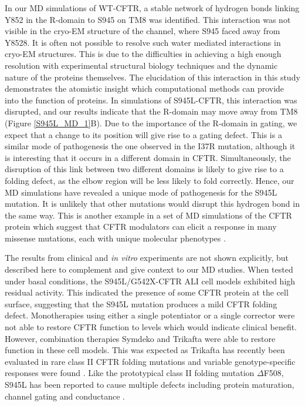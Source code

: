 In our MD simulations of WT-CFTR, a stable network of hydrogen bonds linking Y852 in the R-domain to S945 on TM8 was identified. This interaction was not visible in the cryo-EM structure of the channel, where S945 faced away from Y8528. It is often not possible to resolve such water mediated interactions in cryo-EM structures. This is due to the difficulties in achieving a high enough resolution with experimental structural biology techniques and the dynamic nature of the proteins themselves. The elucidation of this interaction in this study demonstrates the atomistic insight which computational methods can provide into the function of proteins. In simulations of S945L-CFTR, this interaction was disrupted, and our results indicate that the R-domain may move away from TM8 (Figure \ref{S945L_MD_1}B). Due to the importance of the R-domain in gating, we expect that a change to its position will give rise to a gating defect. This is a similar mode of pathogenesis the one observed in the I37R mutation, although it is interesting that it occurs in a different domain in CFTR. Simultaneously, the disruption of this link between two different domains is likely to give rise to a folding defect, as the elbow region will be less likely to fold correctly. Hence, our MD simulations have revealed a unique mode of pathogenesis for the S945L mutation. It is unlikely that other mutations would disrupt this hydrogen bond in the same way. This is another example in a set of MD simulations of the CFTR protein which suggest that CFTR modulators can elicit a response in many missense mutations, each with unique molecular phenotypes \cite{wong2022,wong2022a,billet2020,sabusap2021}. 

The results from clinical and \textit{in vitro} experiments are not shown explicitly, but described here to complement and give context to our MD studies. When tested under basal conditions, the S945L/G542X-CFTR ALI cell models exhibited high residual activity. This indicated the presence of some CFTR protein at the cell surface, suggesting that the S945L mutation produces a mild CFTR folding defect. Monotherapies using either a single potentiator or a single corrector were not able to restore CFTR function to levels which would indicate clinical benefit. However, combination therapies Symdeko and Trikafta were able to restore function in these cell models. This was expected as Trikafta has recently been evaluated in rare class II CFTR folding mutations and variable genotype-specific responses were found \cite{veit2020, laselva2021}. Like the prototypical class II folding mutation $\Delta$F508, S945L has been reported to cause multiple defects including protein maturation, channel gating and conductance \cite{seibert1996}. 


